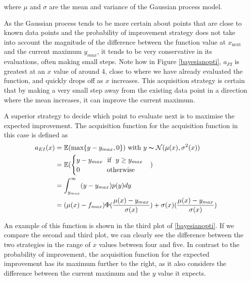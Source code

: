 \documentclass[a4paper,12pt,twoside,openright]{report}
\begin{document}
where $\mu$ and $\sigma$ are the mean and variance of the Gaussian process model.

As the Gaussian process tends to be more certain about points that are close to known data points and the probability of improvement strategy does not take into account the magnitude of the difference between the function value at $x_{\text{next}}$ and the current maximum $y_{max}$, it tends to be very conservative in its evaluations, often making small steps. Note how in Figure \ref{bayesianopti}, $a_{PI}$ is greatest at an $x$ value of around 4, close to where we have already evaluated the function, and quickly drops off as $x$ increases. This acquisition strategy is certain that by making a very small step away from the existing data point in a direction where the mean increases, it can improve the current maximum.

A superior strategy to decide which point to evaluate next is to maximise the expected improvement. The acquisition function for the acquisition function in this case is defined \cite{eipaper} as
\begin{align}
a_{EI}(x) &= \mathbb{E}(\text{max}\{y - y_{max}, 0\}) \text{\ with\ } y \thicksim \mathcal{N}(\mu(x),\sigma^2(x))\\
&= \mathbb{E}(\begin{cases}
        y-y_{max} \text{\ \ if\ \ } y \geq y_{max}
        \\
        0 \text{\ \ \ \ \ \ \ \ \ \ \ \ otherwise}
        \end{cases})\\
&= \int_{y_{max}}^\infty (y-y_{max})p(y)dy\\
&= (\mu(x) - f_{max})\Phi(\frac{\mu(x) - y_{max}}{\sigma(x)}) + \sigma(x)(\frac{\mu(x) - y_{max}}{\sigma(x)})
\end{align}

An example of this function is shown in the third plot of \ref{bayesianopti}. If we compare the second and third plot, we can clearly see the difference between the two strategies in the range of $x$ values between four and five. In contrast to the probability of improvement, the acquisition function for the expected improvement has its maximum further to the right, as it also considers the difference between the current maximum and the $y$ value it expects.
\end{document}

